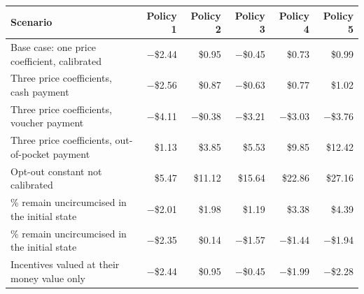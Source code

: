 \begin{tabular}{>{\raggedright\arraybackslash}p{6.2cm}rrrrr}
\toprule
Scenario & Policy 1 & Policy 2 & Policy 3 & Policy 4 & Policy 5
\\
\midrule
Base case: one price coefficient, calibrated & $-$\$2.44 & \$0.95 & $-$\$0.45 & \$0.73 & \$0.99 \\
Three price coefficients, cash payment & $-$\$2.56 & \$0.87 & $-$\$0.63 & \$0.77 & \$1.02 \\
Three price coefficients, voucher payment & $-$\$4.11 & $-$\$0.38 & $-$\$3.21 & $-$\$3.03 & $-$\$3.76 \\
Three price coefficients, out-of-pocket payment & \$1.13 & \$3.85 & \$5.53 & \$9.85 & \$12.42 \\
Opt-out constant not calibrated & \$5.47 & \$11.12 & \$15.64 & \$22.86 & \$27.16 \\
60\% remain uncircumcised in the initial state & $-$\$2.01 & \$1.98 & \$1.19 & \$3.38 & \$4.39 \\
80\% remain uncircumcised in the initial state & $-$\$2.35 & \$0.14 & $-$\$1.57 & $-$\$1.44 & $-$\$1.94 \\
Incentives valued at their money value only & $-$\$2.44 & \$0.95 & $-$\$0.45 & $-$\$1.99 & $-$\$2.28 \\
\bottomrule
\end{tabular}
